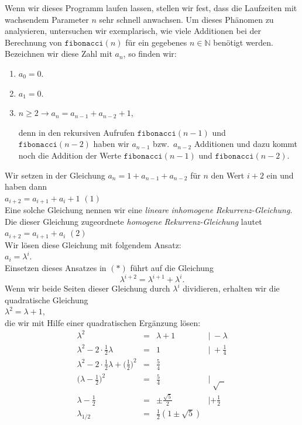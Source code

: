 Wenn wir dieses Programm laufen lassen, stellen wir fest, dass die Laufzeiten mit
wachsendem Parameter $n$ sehr schnell anwachsen.  Um dieses Ph\"anomen zu analysieren,
untersuchen wir exemplarisch, wie viele Additionen bei der Berechnung von
$\texttt{fibonacci}(n)$ f\"ur ein gegebenes $n \in \mathbb{N}$ ben\"otigt werden.  Bezeichnen wir
diese Zahl mit $a_n$, so finden wir:
\begin{enumerate}
\item $a_0 = 0$.
\item $a_1 = 0$.
\item $n \geq 2 \rightarrow a_n = a_{n-1} + a_{n-2} + 1$,

      denn in den rekursiven Aufrufen $\texttt{fibonacci}(n-1)$ und $\texttt{fibonacci}(n-2)$ haben wir 
      $a_{n-1}$ bzw.~$a_{n-2}$ Additionen und dazu kommt noch die Addition der Werte
      $\texttt{fibonacci}(n-1)$ und $\texttt{fibonacci}(n-2)$.
\end{enumerate}
Wir setzen in der  Gleichung $a_n = 1 + a_{n-1} + a_{n-2}$ f\"ur $n$ den Wert $i+2$ ein und
haben dann \\[0.1cm]
\hspace*{1.3cm} $a_{i+2} = a_{i+1} + a_i + 1$ \hspace*{\fill} $(1)$\\[0.1cm]
Eine solche Gleichung nennen wir eine \emph{lineare} \emph{inhomogene}
\emph{Rekur\-renz-Gleichung}.   Die dieser Gleichung zugeordnete \emph{homogene}
\emph{Rekurrenz-Gleichung} lautet \\[0.1cm]
\hspace*{1.3cm} $a_{i+2} = a_{i+1} + a_i$ \hspace*{\fill} $(2)$\\[0.1cm]
Wir l\"osen diese Gleichung mit folgendem Ansatz: \\[0.1cm]
\hspace*{1.3cm} $a_i = \lambda^i$. \\[0.1cm]
Einsetzen dieses Ansatzes in $(*)$ f\"uhrt auf die Gleichung 
\[ \lambda^{i+2} = \lambda^{i+1} + \lambda^i. \]
Wenn wir beide Seiten  dieser Gleichung durch $\lambda^i$ dividieren, erhalten wir die
quadratische Gleichung \\[0.1cm]
\hspace*{1.3cm} $\lambda^2 = \lambda + 1$, \\[0.1cm]
die wir mit Hilfe einer quadratischen Erg\"anzung l\"osen: \\[0.1cm]
\[\begin{array}{lcll}
  \lambda^2     & = & \lambda + 1                               & |\;- \lambda \\[0.1cm]
  \lambda^2 - 2 \cdot \frac{1}{2} \lambda & = & 1                   & |\;+ \frac{1}{4} \\[0.1cm]
  \lambda^2 - 2 \cdot \frac{1}{2} \lambda + \Big(\frac{1}{2}\Big)^2 & = &  \frac{5}{4} &  \\[0.1cm]
  \Big(\lambda -\frac{1}{2}\Big)^2 & = & \frac{5}{4}         & |\;\sqrt{\;\;} \\[0.1cm]
  \lambda -\frac{1}{2} & = & \pm\frac{\sqrt{5}}{2}           & | + \frac{1}{2} \\[0.1cm]
  \lambda_{1/2}  & = & \frac{1}{2} (1 \pm \sqrt{5}) & \\
 \end{array}
\]
